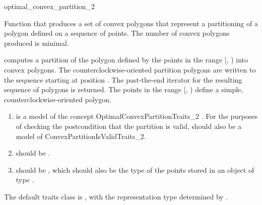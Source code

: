 \begin{ccRefFunction}{optimal_convex_partition_2}

Function that produces a set of convex polygons 
that represent a partitioning of a polygon defined on a sequence of 
points. 
The number of convex polygons produced is minimal.


{
computes a partition of the polygon defined
by the points in the range [, ) into convex
polygons. The counterclockwise-oriented partition polygons are written to
the sequence starting at position .  The past-the-end iterator for
the resulting sequence of polygons is returned.
\ccPrecond The points in the range [, ) define a
simple, counterclockwise-oriented polygon.
}

\begin{enumerate}
    \item {} is a model of the concept OptimalConvexPartitionTraits\_2%
          .
          For the purposes of checking the
          postcondition that the partition is valid,  should
          also be a model of ConvexPartitionIsValidTraits\_2.
    \item {} should be
          .
    \item {} should be ,
          which should also be the type of the points stored in an object
          of type .
\end{enumerate}

The default traits class  is ,
with the representation type determined by .

\ccSeeAlso
{} \\
 \\
 \\
 \\



\end{ccRefFunction}
